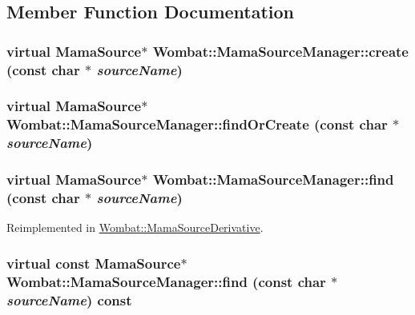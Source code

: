 \subsection{Member Function Documentation}
\hypertarget{classWombat_1_1MamaSourceManager_a48e8e63e2e5d5992f374165f63b7ae9c}{
\subsubsection[{create}]{\setlength{\rightskip}{0pt plus 5cm}virtual {\bf MamaSource}$\ast$ Wombat::MamaSourceManager::create (const char $\ast$ {\em sourceName})}}
\label{classWombat_1_1MamaSourceManager_a48e8e63e2e5d5992f374165f63b7ae9c}
\hypertarget{classWombat_1_1MamaSourceManager_aeadd2948a8f91b35875ba7648b38a7f9}{
\subsubsection[{findOrCreate}]{\setlength{\rightskip}{0pt plus 5cm}virtual {\bf MamaSource}$\ast$ Wombat::MamaSourceManager::findOrCreate (const char $\ast$ {\em sourceName})}}
\label{classWombat_1_1MamaSourceManager_aeadd2948a8f91b35875ba7648b38a7f9}
\hypertarget{classWombat_1_1MamaSourceManager_a378d8f731a0482fdbcf4147fee8e8d16}{
\subsubsection[{find}]{\setlength{\rightskip}{0pt plus 5cm}virtual {\bf MamaSource}$\ast$ Wombat::MamaSourceManager::find (const char $\ast$ {\em sourceName})}}
\label{classWombat_1_1MamaSourceManager_a378d8f731a0482fdbcf4147fee8e8d16}


Reimplemented in \hyperlink{classWombat_1_1MamaSourceDerivative_a625240eadddf0f2f2f08d7187dbbd9f6}{Wombat::MamaSourceDerivative}.\hypertarget{classWombat_1_1MamaSourceManager_aa54946b75daea1c445ce03b6f863dd56}{
\subsubsection[{find}]{\setlength{\rightskip}{0pt plus 5cm}virtual const {\bf MamaSource}$\ast$ Wombat::MamaSourceManager::find (const char $\ast$ {\em sourceName}) const}}
\label{classWombat_1_1MamaSourceManager_aa54946b75daea1c445ce03b6f863dd56}


